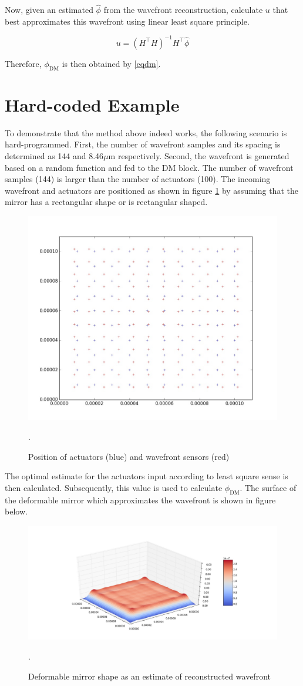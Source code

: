 \documentclass[]{article}
\begin{document}
Now, given an estimated $ \hat{\phi} $ from the wavefront reconstruction, calculate $u$ that best approximates this wavefront using linear least square principle.

\begin{equation}
u = (H^\top H)^{-1}H^\top \hat{\phi}
\end{equation}

Therefore, $ \phi_{\text{DM}} $ is then obtained by  \eqref{eqdm}.

\section{Hard-coded Example}

To demonstrate that the method above indeed works, the following scenario is hard-programmed. First, the number of wavefront samples and its spacing is determined as 144 and 8.46$ \mu $m respectively. Second, the wavefront is generated based on a random function and fed to the DM block. The number of wavefront samples (144) is larger than the number of actuators (100). The incoming wavefront and actuators are positioned as shown in figure \ref{fig2} by assuming that the mirror has a rectangular shape or is rectangular shaped.

\begin{figure}[h!]
\centering
\includegraphics[width=0.7\linewidth]{figures/fig2}
\caption{Position of actuators (blue) and wavefront sensors (red)}.
\label{fig2}
\end{figure}

The optimal estimate for the actuators input according to least square sense is then calculated. Subsequently, this value is used to calculate $ \phi_{\text{DM}} $. The surface of the deformable mirror which approximates the wavefront is shown in figure below.

\begin{figure}[h!]
\centering
\includegraphics[width=1\linewidth]{figures/fig3}
\caption{Deformable mirror shape as an estimate of reconstructed wavefront}.
\label{fig3}
\end{figure}
\end{document}
